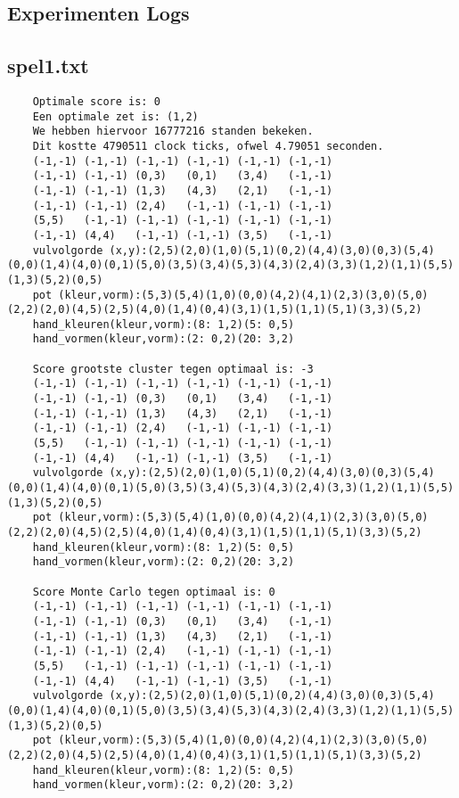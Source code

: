 \documentclass[10pt]{article}
\begin{document}
\begin{appendices}
    \section{Experimenten Logs}
    \subsection{spel1.txt}
    \begin{lstlisting}
    Optimale score is: 0
    Een optimale zet is: (1,2)
    We hebben hiervoor 16777216 standen bekeken.
    Dit kostte 4790511 clock ticks, ofwel 4.79051 seconden.
    (-1,-1) (-1,-1) (-1,-1) (-1,-1) (-1,-1) (-1,-1)
    (-1,-1) (-1,-1) (0,3)   (0,1)   (3,4)   (-1,-1)
    (-1,-1) (-1,-1) (1,3)   (4,3)   (2,1)   (-1,-1)
    (-1,-1) (-1,-1) (2,4)   (-1,-1) (-1,-1) (-1,-1)
    (5,5)   (-1,-1) (-1,-1) (-1,-1) (-1,-1) (-1,-1)
    (-1,-1) (4,4)   (-1,-1) (-1,-1) (3,5)   (-1,-1)
    vulvolgorde (x,y):(2,5)(2,0)(1,0)(5,1)(0,2)(4,4)(3,0)(0,3)(5,4)(0,0)(1,4)(4,0)(0,1)(5,0)(3,5)(3,4)(5,3)(4,3)(2,4)(3,3)(1,2)(1,1)(5,5)(1,3)(5,2)(0,5)
    pot (kleur,vorm):(5,3)(5,4)(1,0)(0,0)(4,2)(4,1)(2,3)(3,0)(5,0)(2,2)(2,0)(4,5)(2,5)(4,0)(1,4)(0,4)(3,1)(1,5)(1,1)(5,1)(3,3)(5,2)
    hand_kleuren(kleur,vorm):(8: 1,2)(5: 0,5)
    hand_vormen(kleur,vorm):(2: 0,2)(20: 3,2)

    Score grootste cluster tegen optimaal is: -3
    (-1,-1) (-1,-1) (-1,-1) (-1,-1) (-1,-1) (-1,-1)
    (-1,-1) (-1,-1) (0,3)   (0,1)   (3,4)   (-1,-1)
    (-1,-1) (-1,-1) (1,3)   (4,3)   (2,1)   (-1,-1)
    (-1,-1) (-1,-1) (2,4)   (-1,-1) (-1,-1) (-1,-1)
    (5,5)   (-1,-1) (-1,-1) (-1,-1) (-1,-1) (-1,-1)
    (-1,-1) (4,4)   (-1,-1) (-1,-1) (3,5)   (-1,-1)
    vulvolgorde (x,y):(2,5)(2,0)(1,0)(5,1)(0,2)(4,4)(3,0)(0,3)(5,4)(0,0)(1,4)(4,0)(0,1)(5,0)(3,5)(3,4)(5,3)(4,3)(2,4)(3,3)(1,2)(1,1)(5,5)(1,3)(5,2)(0,5)
    pot (kleur,vorm):(5,3)(5,4)(1,0)(0,0)(4,2)(4,1)(2,3)(3,0)(5,0)(2,2)(2,0)(4,5)(2,5)(4,0)(1,4)(0,4)(3,1)(1,5)(1,1)(5,1)(3,3)(5,2)
    hand_kleuren(kleur,vorm):(8: 1,2)(5: 0,5)
    hand_vormen(kleur,vorm):(2: 0,2)(20: 3,2)

    Score Monte Carlo tegen optimaal is: 0
    (-1,-1) (-1,-1) (-1,-1) (-1,-1) (-1,-1) (-1,-1)
    (-1,-1) (-1,-1) (0,3)   (0,1)   (3,4)   (-1,-1)
    (-1,-1) (-1,-1) (1,3)   (4,3)   (2,1)   (-1,-1)
    (-1,-1) (-1,-1) (2,4)   (-1,-1) (-1,-1) (-1,-1)
    (5,5)   (-1,-1) (-1,-1) (-1,-1) (-1,-1) (-1,-1)
    (-1,-1) (4,4)   (-1,-1) (-1,-1) (3,5)   (-1,-1)
    vulvolgorde (x,y):(2,5)(2,0)(1,0)(5,1)(0,2)(4,4)(3,0)(0,3)(5,4)(0,0)(1,4)(4,0)(0,1)(5,0)(3,5)(3,4)(5,3)(4,3)(2,4)(3,3)(1,2)(1,1)(5,5)(1,3)(5,2)(0,5)
    pot (kleur,vorm):(5,3)(5,4)(1,0)(0,0)(4,2)(4,1)(2,3)(3,0)(5,0)(2,2)(2,0)(4,5)(2,5)(4,0)(1,4)(0,4)(3,1)(1,5)(1,1)(5,1)(3,3)(5,2)
    hand_kleuren(kleur,vorm):(8: 1,2)(5: 0,5)
    hand_vormen(kleur,vorm):(2: 0,2)(20: 3,2)


\end{lstlisting}
\end{appendices}
\end{document}
